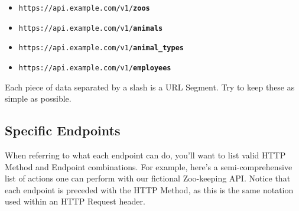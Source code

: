\documentclass{book}
\begin{document}
\begin{itemize}
\item \texttt{https://api.example.com/v1/\textbf{zoos}}
\item \texttt{https://api.example.com/v1/\textbf{animals}}
\item \texttt{https://api.example.com/v1/\textbf{animal\_types}}
\item \texttt{https://api.example.com/v1/\textbf{employees}}
\end{itemize}

Each piece of data separated by a slash is a URL Segment. Try to keep these as simple as possible.

\subsection{Specific Endpoints}

When referring to what each endpoint can do, you'll want to list valid HTTP Method and Endpoint combinations. For example, here's a semi-comprehensive list of actions one can perform with our fictional Zoo-keeping API. Notice that each endpoint is preceded with the HTTP Method, as this is the same notation used within an HTTP Request header.
\end{document}
